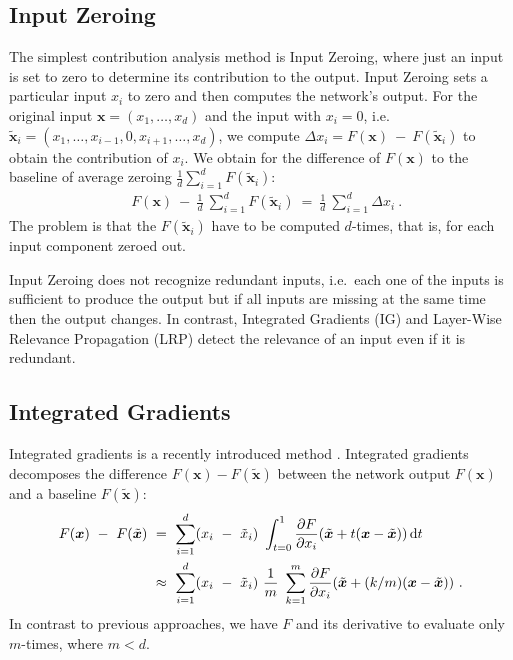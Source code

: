 \documentclass{article}
\newcommand\Bx{\bm{x}}
\begin{document}
\begin{appendices}
                           



\subsection{Input Zeroing}

The simplest contribution analysis method is Input Zeroing, where just
an input is set to zero to determine its contribution to the output.
Input Zeroing sets a particular input $x_i$ to zero and then computes
the network's output. For the original input $\Bx=(x_1,\ldots,x_d)$ and the input with
$x_i=0$, i.e.\ $\tilde{\Bx}_i=(x_1,\ldots,x_{i-1},0,x_{i+1},\ldots,x_d)$,
we compute $\Delta x_i=F(\Bx) \ - \ F(\tilde{\Bx}_i)$ to obtain the
contribution of $x_i$. 
We obtain for the difference of $F(\Bx)$ to the baseline
of average zeroing $\frac{1}{d} \sum_{i=1}^d F(\tilde{\Bx}_i)$:
\begin{align}
  &F(\Bx)  \ - \ \frac{1}{d} \ \sum_{i=1}^d F(\tilde{\Bx}_i) \ = \
  \frac{1}{d} \ \sum_{i=1}^d \Delta x_i \ .
\end{align}
The problem is that the $F(\tilde{\Bx}_i)$ have to be computed $d$-times, that
is, for each input component zeroed out.

Input Zeroing does not recognize redundant inputs, i.e.\ each one of the 
inputs is sufficient 
to produce the output but if all inputs are missing at the same time 
then the output changes. 
In contrast, Integrated Gradients (IG) and Layer-Wise Relevance Propagation (LRP)
detect the relevance of an input even if it is redundant.



\subsection{Integrated Gradients}

Integrated gradients is a recently introduced method
\cite{Sundararajan:17}.
Integrated gradients decomposes the difference $F(\Bx)-F(\tilde{\Bx})$
between the network output $F(\Bx)$ and a baseline $F(\tilde{\Bx})$:
\begin{align}
\label{eq:intgrad}
 F(\Bx) \ - \ F(\tilde{\Bx}) \ &= \ \sum_{i=1}^d (x_i \ - \
 \tilde{x}_i) \ \int_{t=0}^{1}
 \frac{\partial F}{\partial x_i}(\tilde{\Bx}+ t (\Bx-\tilde{\Bx}))
 \, \Rd t \\ \nonumber
 &\approx \
 \sum_{i=1}^d (x_i \ - \ \tilde{x}_i) \ \frac{1}{m} \ \sum_{k=1}^m
 \frac{\partial F}{\partial x_i}(\tilde{\Bx}+ (k/m)
 (\Bx-\tilde{\Bx})) \ .
\end{align}
In contrast to previous approaches, we have $F$ and its derivative to
evaluate only $m$-times, where $m<d$.
 


\end{appendices}
\end{document}

